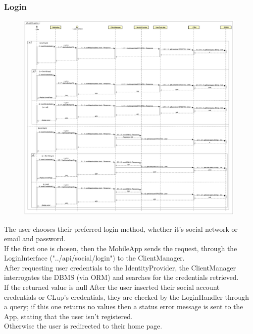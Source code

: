 \documentclass[table, 12pt]{article}
\begin{document}
\subsubsection{Login}
\begin{figure}[H]
    \begin{center}
        \includegraphics[width=\textwidth]{assets/Sequence-Diagram/LoginSequence.png}
    \end{center}
\end{figure}
The user chooses their preferred login method, whether it's social network or email and password.\\
If the first one is chosen, then the MobileApp sends the request, through the LoginInterface ("../api/social/login") to the ClientManager.\\
After requesting user credentials to the IdentityProvider, the ClientManager interrogates the DBMS (via ORM) and searches for the credentials retrieved.\\
If the returned value is null
After the user inserted their social account credentials or CLup's credentials, they are checked by the LoginHandler through a query; if this one returns no values then a status error message is sent to the App, stating that the user isn't registered.\\
Otherwise the user is redirected to their home page.
\end{document}
